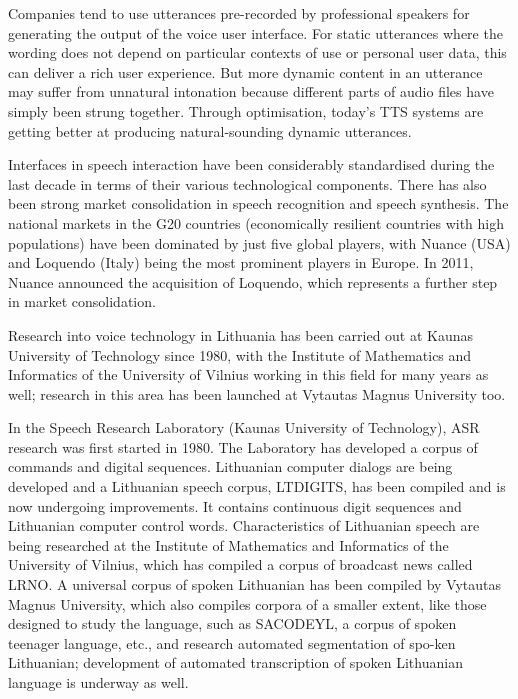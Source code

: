 \begin{multicols}{2}

Companies tend to use utterances pre-recorded by professional speakers for generating the output of the voice user interface. For static utterances where the wording does not depend on particular contexts of use or personal user data, this can deliver a rich user experience. But more dynamic content in an utterance may suffer from unnatural intonation because different parts of audio files have simply been strung together. Through optimisation, today’s TTS systems are getting better at producing natural-sounding dynamic utterances.

Interfaces in speech interaction have been considerably standardised during the last decade in terms of their various technological components. There has also been strong market consolidation in speech recognition and speech synthesis. The national markets in the G20 countries (economically resilient countries with high populations) have been dominated by just five global players, with Nuance (USA) and Loquendo (Italy) being the most prominent players in Europe. In 2011, Nuance announced the acquisition of Loquendo, which represents a further step in market consolidation.

 Research into voice technology in Lithuania has been carried out at Kaunas University of Technology since 1980, with the Institute of Mathematics and Informatics of the University of Vilnius working in this field for many years as well; research in this area has been launched at Vytautas Magnus University too.

   In the Speech Research Laboratory (Kaunas University of Technology), ASR research was first started in 1980. The Laboratory has developed a corpus of commands and digital sequences. Lithuanian computer dialogs are being developed and a Lithuanian speech corpus, LTDIGITS, has been compiled and is now undergoing improvements. It contains continuous digit sequences and Lithuanian computer control words. Characteristics of Lithuanian speech are being researched at the Institute of Mathematics and Informatics of the University of Vilnius, which has compiled a corpus of broadcast news called LRNO. A universal corpus of spoken Lithuanian has been compiled by Vytautas Magnus University, which also compiles corpora of a smaller extent, like those designed to study the language, such as SACODEYL, a corpus of  spoken teenager language, etc., and research automated segmentation of spo-ken Lithuanian; development of automated transcription of spoken Lithuanian language is underway as well.


\end{multicols}
